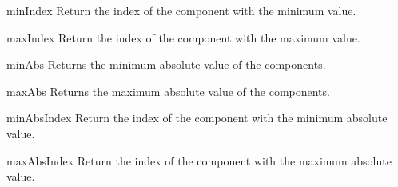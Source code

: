 \begin{methoddesc}{minIndex}{}
Return the index of the component with the minimum value.
\end{methoddesc}

\begin{methoddesc}{maxIndex}{}
Return the index of the component with the maximum value.
\end{methoddesc}

\begin{methoddesc}{minAbs}{}
Returns the minimum absolute value of the components.
\end{methoddesc}

\begin{methoddesc}{maxAbs}{}
Returns the maximum absolute value of the components.
\end{methoddesc}

\begin{methoddesc}{minAbsIndex}{}
Return the index of the component with the minimum absolute value.
\end{methoddesc}

\begin{methoddesc}{maxAbsIndex}{}
Return the index of the component with the maximum absolute value.
\end{methoddesc}

